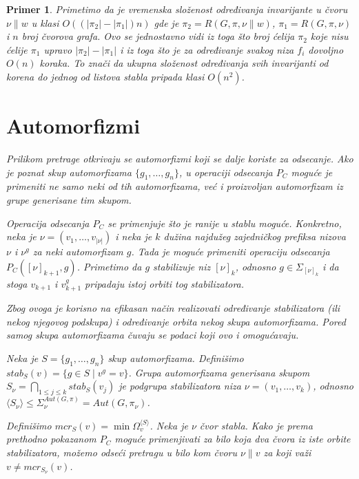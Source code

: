\documentclass[12pt,oneside]{memoir}
\newtheorem{example}{Primer}
\theoremstyle{definition}
\begin{document}
\begin{example}
  Primetimo da je vremenska složenost određivanja invarijante u čvoru $\nu \|
  w$ u klasi $O((|\pi_2| - |\pi_1|)n)$ gde je $\pi_2 = R(G, \pi, \nu \| w)$,
  $\pi_1 = R(G, \pi, \nu)$ i $n$ broj čvorova grafa. Ovo se jednostavno vidi iz
  toga što broj ćelija $\pi_2$ koje nisu ćelije $\pi_1$ upravo $|\pi_2| -
  |\pi_1|$ i iz toga što je za određivanje svakog niza $f_i$ dovoljno $O(n)$
  koraka. To znači da ukupna složenost određivanja svih invarijanti od korena
  do jednog od listova stabla pripada klasi $O(n^2)$.

 \section{Automorfizmi}

  Prilikom pretrage otkrivaju se automorfizmi koji se dalje koriste za
  odsecanje. Ako je poznat skup automorfizama $\{g_1, \dots, g_n\}$, u
  operaciji odsecanja $P_C$ moguće je primeniti ne samo neki od tih
  automorfizama, već i proizvoljan automorfizam iz grupe generisane tim skupom.
  
  Operacija odsecanja $P_C$ se primenjuje što je ranije u stablu moguće.
  Konkretno, neka je $\nu = (v_1, \dots, v_{|\nu|})$ i neka je $k$ dužina
  najdužeg zajedničkog prefiksa nizova $\nu$ i $\nu^g$ za neki automorfizam
  $g$. Tada je moguće primeniti operaciju odsecanja $P_C([\nu]_{k+1}, g)$.
  Primetimo da $g$ stabilizuje niz $[\nu]_k$, odnosno $g \in \Sigma_{[\nu]_k}$
  i da stoga $v_{k+1}$ i $v_{k+1}^g$ pripadaju istoj orbiti tog stabilizatora.

  Zbog ovoga je korisno na efikasan način realizovati određivanje stabilizatora
  (ili nekog njegovog podskupa) i određivanje orbita nekog skupa automorfizama.
  Pored samog skupa automorfizama čuvaju se podaci koji ovo i omogućavaju.

  Neka je $S = \{g_1, \dots, g_n\}$ skup automorfizama. Definišimo $stab_S(v) =
  \{g \in S \mid v^{g} = v\}$. Grupa automorfizama generisana skupom $S_\nu =
  \bigcap_{1 \leq j \leq k} stab_S(v_j)$ je podgrupa stabilizatora niza $\nu =
  (v_1, \dots, v_k)$, odnosno $\langle S_\nu \rangle \leq \Sigma^{Aut(G,
  \pi)}_\nu = Aut(G, \pi_\nu)$.

  Definišimo $mcr_S(v) = \min \Omega_v^{\langle S \rangle}$. Neka je $\nu$ čvor stabla.
  Kako je prema prethodno pokazanom $P_C$ moguće primenjivati za bilo koja dva
  čvora iz iste orbite stabilizatora, možemo odseći pretragu u bilo kom čvoru
  $\nu \| v$ za koji važi $v \neq mcr_{S_\nu}(v)$.


\end{example}
\end{document}
